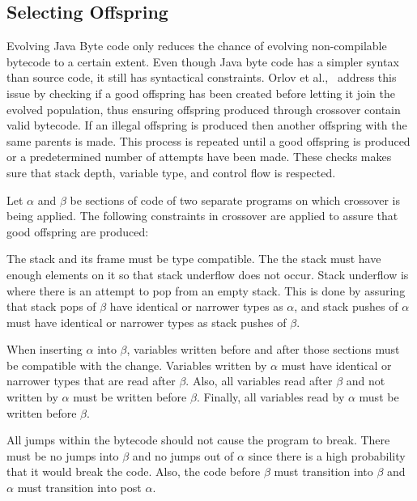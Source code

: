 \documentclass{sig-alternate}
\begin{document}
\subsection{Selecting Offspring}
Evolving Java Byte code only reduces the chance of evolving non-compilable bytecode to a certain extent. Even though Java byte code has a simpler syntax than source code, it still has syntactical constraints. Orlov et al.,~\cite{FINCH2:2009} address this issue by checking if a good offspring has been created before letting it join the evolved population, thus ensuring offspring produced through crossover contain valid bytecode. If an illegal offspring is produced then another offspring with the same parents is made. This process is repeated until a good offspring is produced or a predetermined number of attempts have been made. These checks makes sure that stack depth, variable type, and control flow is respected.\par

Let $\alpha$ and $\beta$ be sections of code of two separate programs on which crossover is being applied.
The following constraints in crossover are applied to assure that good offspring are produced:\par

The stack and its frame must be type compatible. The the stack must have enough elements on it so that stack underflow does not occur. Stack underflow is where there is an attempt to pop from an empty stack. This is done by assuring that stack pops of $\beta$ have identical or narrower types as $\alpha$, and stack pushes of $\alpha$ must have identical or narrower types as stack pushes of $\beta$. \par

When inserting $\alpha$ into $\beta$, variables written before and after those sections must be compatible with the change. Variables written by $\alpha$ must have identical or narrower types that are read after $\beta$. Also, all variables read after $\beta$ and not written by $\alpha$ must be written before $\beta$. Finally, all variables read by $\alpha$ must be written before $\beta$.\par

All jumps within the bytecode should not cause the program to break. There must be no jumps into $\beta$ and no jumps out of $\alpha$ since there is a high probability that it would break the code. Also, the code before $\beta$ must transition into $\beta$ and $\alpha$ must transition into post $\alpha$.\par
\end{document}

